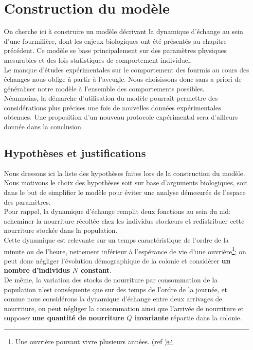 \chapter{Construction du modèle}

On cherche ici à construire un modèle décrivant la dynamique d'échange au sein d'une fourmilière, dont les enjeux biologiques ont été présentés au chapitre précédent. Ce modèle se base principalement sur des paramètres physiques mesurables et des lois statistiques de comportement individuel. \\

Le manque d'études expérimentales sur le comportement des fourmis au cours des échanges nous oblige à partir à l'aveugle. Nous choisissons donc sans a priori de généraliser notre modèle à l'ensemble des comportements possibles.\\

Néanmoins, la démarche d'utilisation du modèle pourrait permettre des considérations plus précises une fois de nouvelles données expérimentales obtenues. Une proposition d'un nouveau protocole expérimental sera d'ailleurs donnée dans la conclusion.


\section{Hypothèses et justifications}
Nous dressons ici la liste des hypothèses faites lors de la construction du modèle. Nous motivons le choix des hypothèses soit sur base d'arguments biologiques, soit dans le but de simplifier le modèle pour éviter une analyse démesurée de l'espace des paramètres.\\

Pour rappel, la dynamique d'échange remplit deux fonctions au sein du nid: acheminer la nourriture récoltée chez les individus stockeurs et redistribuer cette nourriture stockée dans la population. \\

Cette dynamique est relevante sur un temps caractéristique de l'ordre de la minute ou de l'heure, nettement inférieur à l'espérance de vie d'une ouvrière\footnote{Une ouvrière pouvant vivre plusieurs années. (ref \fixme)}; on peut donc négliger l'évolution démographique de la colonie et considérer \textbf{un nombre d'individus $N$ constant}.\\

De même, la variation des stocks de nourriture par consommation de la population n'est conséquente que sur des temps de l'ordre de la journée, et comme nous considérons la dynamique d'échange entre deux arrivages de nourriture, on peut négliger la consommation ainsi que l'arrivée de nourriture et supposer \textbf{une quantité de nourriture $Q$ invariante} répartie dans la colonie.\\


